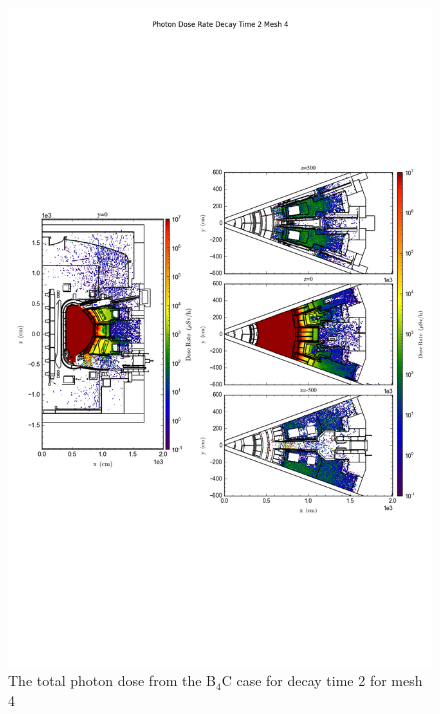 \documentclass[12pt]{article}
\begin{document}
\begin{figure}[ht!]
\centering
\includegraphics[trim={0cm 9cm 0cm 10cm},clip,scale=0.75]{../plots/final_model/Photon_Dose_Rate_Decay_Time_2_Mesh_4.png}
\caption{The total photon dose from the B$_4$C case for decay time 2 for mesh 4}
\label{fig:ct_photons_dc2_no4bc_m4_flux}
\end{figure}
\newpage
\clearpage
\end{document}
